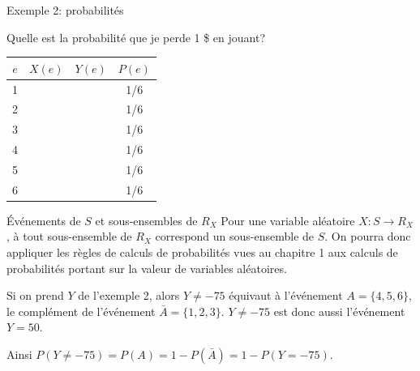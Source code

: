 \documentclass[handout]{BeamerTemplate}
\begin{document}
\begin{frame}[t]{Exemple 2: probabilités}

Quelle est la probabilité que je perde 1 \$ en jouant?\\


{\large
 \begin{tabular}{c|c|c|c}\hline
 $e$ & $X(e)$ & $Y(e)$ & $P(e)$ \\ \hline
  1 & & & 1/6 \\
  2 & &  & 1/6  \\
  3 & &  & 1/6  \\
  4 & &  & 1/6  \\
  5 & &  & 1/6  \\
  6 & &  & 1/6  \\ \hline
 \end{tabular}
}


\end{frame}

\begin{frame}[t]{Événements de $S$ et sous-ensembles de $R_X$}
Pour une variable aléatoire $X: S\to R_X$, à tout sous-ensemble de $R_X$ correspond un sous-ensemble de $S$.
On pourra donc appliquer les règles de calculs de probabilités
vues au chapitre 1 aux calculs de probabilités portant
sur la valeur de variables aléatoires.

\bigskip

{
Si on prend $Y$ de l'exemple 2, alors $Y\neq-75$ équivaut à l'événement
$A=\{4,5,6\}$, le complément de l'événement $\bar{A}=\{1,2,3\}$. $Y\neq-75$
est donc aussi l'événement $Y=50$. 

Ainsi $P(Y\neq -75)=P(A)=1-P(\bar{A})=1-P(Y=-75)$.
}
\end{frame}
\end{document}
